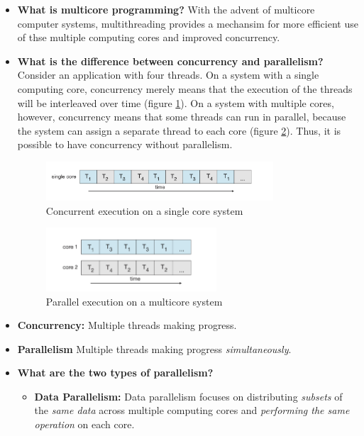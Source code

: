 \documentclass[12pt]{article}
\begin{document}
\begin{itemize}
    \item \textbf{What is multicore programming?} With the advent of multicore computer systems, multithreading provides a mechansim for more efficient use of thse multiple computing cores and improved concurrency.
    \item \textbf{What is the difference between concurrency and parallelism?} Consider an application with four threads. On a system with a single computing core, concurrency merely means that the execution of the threads will be interleaved over time (figure \ref{fig:concurrent-execution}). On a system with multiple cores, however, concurrency means that some threads can run in parallel, because the system can assign a separate thread to each core (figure \ref{fig:parallel-execution}). Thus, it is possible to have concurrency without parallelism.
        \begin{figure}[ht]
            \centering
            \includegraphics[width=0.8\textwidth]{figures/concurrent-execution.jpg}
            \caption{Concurrent execution on a single core system}
            \label{fig:concurrent-execution}
        \end{figure}
        \begin{figure}[ht]
            \centering
            \includegraphics[width=0.6\textwidth]{figures/parallel-execution.jpg}
            \caption{Parallel execution on a multicore system}
            \label{fig:parallel-execution}
        \end{figure}
    \item \textbf{Concurrency:} Multiple threads making progress.
    \item \textbf{Parallelism} Multiple threads making progress \textit{simultaneously}.
    \item \textbf{What are the two types of parallelism?}
        \begin{itemize}
            \item \textbf{Data Parallelism:} Data parallelism focuses on distributing \textit{subsets} of the \textit{same data} across multiple computing cores and \textit{performing the same operation} on each core.

\end{itemize}
\end{itemize}
\end{document}
